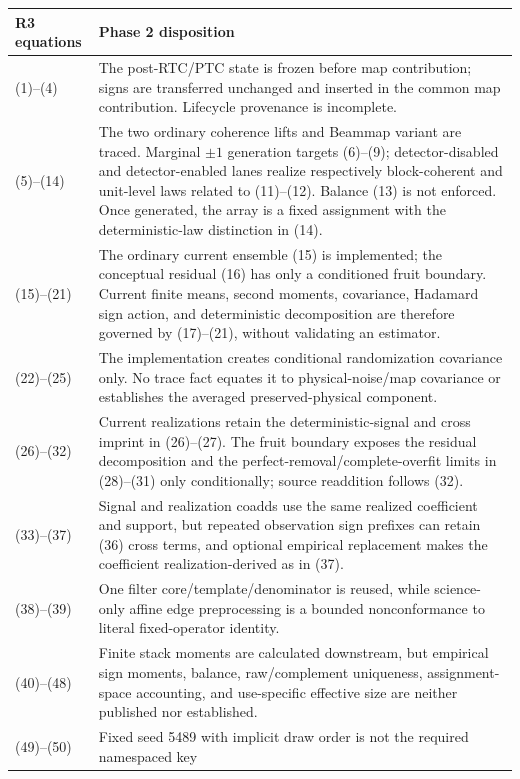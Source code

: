 \documentclass[10pt]{article}
\begin{document}
\begin{longtable}{@{}p{}p{}@{}}
\toprule
R3 equations & Phase 2 disposition \\
\midrule
\endhead
(1)--(4) &
The post-RTC/PTC state is frozen before map contribution; signs are transferred
unchanged and inserted in the common map contribution.  Lifecycle provenance
is incomplete. \\
(5)--(14) &
The two ordinary coherence lifts and Beammap variant are traced.  Marginal
$\pm1$ generation targets (6)--(9); detector-disabled and detector-enabled
lanes realize respectively block-coherent and unit-level laws related to
(11)--(12).  Balance (13) is not enforced.  Once generated, the array is a
fixed assignment with the deterministic-law distinction in (14). \\
(15)--(21) &
The ordinary current ensemble (15) is implemented; the conceptual residual
(16) has only a conditioned fruit boundary.  Current finite means, second
moments, covariance, Hadamard sign action, and deterministic decomposition are
therefore governed by (17)--(21), without validating an estimator. \\
(22)--(25) &
The implementation creates conditional randomization covariance only.  No
trace fact equates it to physical-noise/map covariance or establishes the
averaged preserved-physical component. \\
(26)--(32) &
Current realizations retain the deterministic-signal and cross imprint in
(26)--(27).  The fruit boundary exposes the residual decomposition and the
perfect-removal/complete-overfit limits in (28)--(31) only conditionally;
source readdition follows (32). \\
(33)--(37) &
Signal and realization coadds use the same realized coefficient and support,
but repeated observation sign prefixes can retain (36) cross terms, and
optional empirical replacement makes the coefficient realization-derived as
in (37). \\
(38)--(39) &
One filter core/template/denominator is reused, while science-only affine edge
preprocessing is a bounded nonconformance to literal fixed-operator identity. \\
(40)--(48) &
Finite stack moments are calculated downstream, but empirical sign moments,
balance, raw/complement uniqueness, assignment-space accounting, and
use-specific effective size are neither published nor established. \\
(49)--(50) &
Fixed seed 5489 with implicit draw order is not the required namespaced key

\end{longtable}
\end{document}
